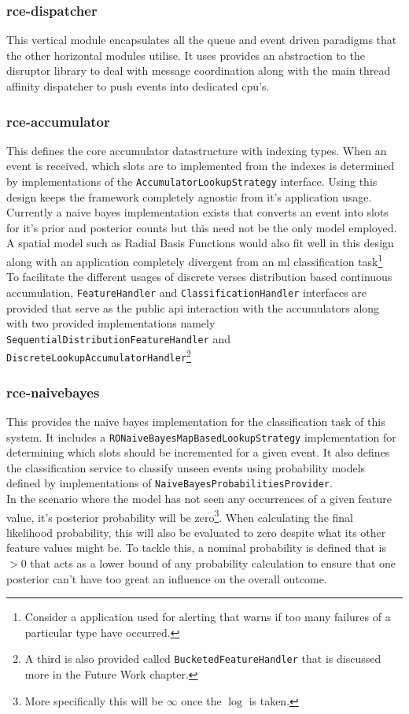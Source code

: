\documentclass[a4paper,11pt]{scrreprt}
\begin{document}
\subsubsection{rce-dispatcher}
This vertical module encapsulates all the queue and event driven paradigms that the other horizontal modules utilise. It uses provides an abstraction to the disruptor library to deal with message coordination along with the main thread affinity dispatcher to push events into dedicated \acrshort{cpu}'s.

\subsubsection{rce-accumulator}
This defines the core accumulator datastructure with indexing types. When an event is received, which slots are to implemented from the indexes is determined by implementations of the \verb|AccumulatorLookupStrategy| interface. Using this design keeps the framework completely agnostic from it's application usage. Currently a naive bayes implementation exists that converts an event into slots for it's prior and posterior counts but this need not be the only model employed. A spatial model such as Radial Basis Functions would also fit well in this design along with an application completely divergent from an \acrshort{ml} classification task\footnote{Consider a application used for alerting that warns if too many failures of a particular type have occurred.}\\
To facilitate the different usages of discrete verses distribution based continuous accumulation, \verb|FeatureHandler| and \verb|ClassificationHandler| interfaces are provided that serve as the public \acrshort{api} interaction with the accumulators along with two provided implementations namely \verb|SequentialDistributionFeatureHandler| and\\ \verb|DiscreteLookupAccumulatorHandler|\footnote{A third is also provided called \verb|BucketedFeatureHandler| that is discussed more in the Future Work chapter.}

\subsubsection{rce-naivebayes}
This provides the naive bayes implementation for the classification task of this system. It includes a \verb|RONaiveBayesMapBasedLookupStrategy| implementation for determining which slots should be incremented for a given event. It also defines the classification service to classify unseen events using probability models defined by implementations of \verb|NaiveBayesProbabilitiesProvider|. \\In the scenario where the model has not seen any occurrences of a given feature value, it's posterior probability will be zero\footnote{More specifically this will be \(\infty\) once the \(\log\) is taken.}. When calculating the final likelihood probability, this will also be evaluated to zero despite what its other feature values might be. To tackle this, a nominal probability is defined that is \(> 0\) that acts as a lower bound of any probability calculation to ensure that one posterior can't have too great an influence on the overall outcome.  
\end{document}
